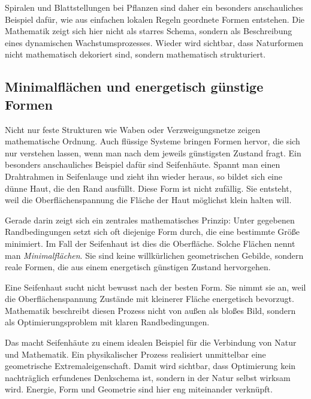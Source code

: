 Spiralen und Blattstellungen bei Pflanzen sind daher ein besonders anschauliches Beispiel dafür,
wie aus einfachen lokalen Regeln geordnete Formen entstehen.
Die Mathematik zeigt sich hier nicht als starres Schema,
sondern als Beschreibung eines dynamischen Wachstumsprozesses.
Wieder wird sichtbar,
dass Naturformen nicht mathematisch dekoriert sind,
sondern mathematisch strukturiert.


\subsection{Minimalflächen und energetisch günstige Formen}

Nicht nur feste Strukturen wie Waben oder Verzweigungsnetze zeigen mathematische Ordnung.
Auch flüssige Systeme bringen Formen hervor,
die sich nur verstehen lassen,
wenn man nach dem jeweils günstigsten Zustand fragt.
Ein besonders anschauliches Beispiel dafür sind Seifenhäute.
Spannt man einen Drahtrahmen in Seifenlauge
und zieht ihn wieder heraus,
so bildet sich eine dünne Haut,
die den Rand ausfüllt.
Diese Form ist nicht zufällig.
Sie entsteht,
weil die Oberflächenspannung die Fläche der Haut möglichst klein halten will.

Gerade darin zeigt sich ein zentrales mathematisches Prinzip:
Unter gegebenen Randbedingungen setzt sich oft diejenige Form durch,
die eine bestimmte Größe minimiert.
Im Fall der Seifenhaut ist dies die Oberfläche.
Solche Flächen nennt man \emph{Minimalflächen}.
Sie sind keine willkürlichen geometrischen Gebilde,
sondern reale Formen,
die aus einem energetisch günstigen Zustand hervorgehen.

\begin{DidacticBox}
	\label{box:seifenhaut}
	Eine Seifenhaut \glqq sucht\grqq{} nicht bewusst nach der besten Form.
	Sie nimmt sie an,
	weil die Oberflächenspannung Zustände mit kleinerer Fläche energetisch bevorzugt.
	Mathematik beschreibt diesen Prozess nicht von außen als bloßes Bild,
	sondern als Optimierungsproblem mit klaren Randbedingungen.
\end{DidacticBox}

Das macht Seifenhäute zu einem idealen Beispiel für die Verbindung von Natur und Mathematik.
Ein physikalischer Prozess realisiert unmittelbar eine geometrische Extremaleigenschaft.
Damit wird sichtbar,
dass Optimierung kein nachträglich erfundenes Denkschema ist,
sondern in der Natur selbst wirksam wird.
Energie,
Form
und Geometrie sind hier eng miteinander verknüpft.

